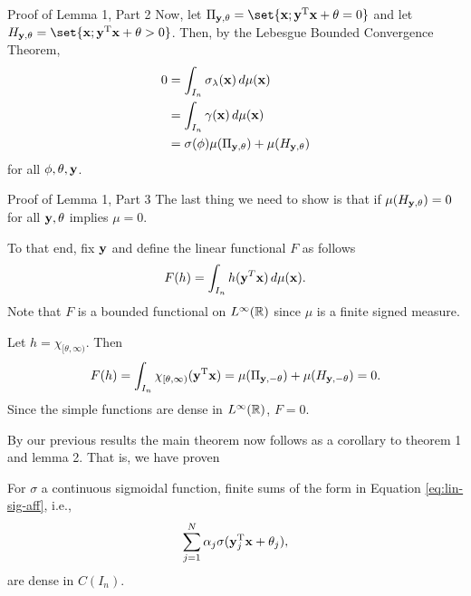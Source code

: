 \documentclass[11pt,letterpaper]{beamer}
\begin{document}
\begin{frame}{Proof of Lemma 1, Part 2}
  Now, let $\Pi_{\bfy,\theta}=\set{\bfx;\bfy^\rmT\bfx+\theta=0}$ and let
  $H_{\bfy,\theta}=\set{\bfx;\bfy^\rmT\bfx+\theta>0}$. Then, by the Lebesgue
  Bounded Convergence Theorem,
  \begin{align*}
    0&=\int_{I_n}\sigma_\lambda(\mathbf{x})\mathop{}\!d\mu(\mathbf{x})\\
     &=\int_{I_n}\gamma(\mathbf{x})\mathop{}\!d\mu(\mathbf{x})\\
     &=\sigma(\phi)\mu(\Pi_{\mathbf{y},\theta})+\mu(H_{\mathbf{y},\theta})
  \end{align*}
  for all $\phi,\theta,\mathbf{y}$.
\end{frame}

\begin{frame}{Proof of Lemma 1, Part 3}
  The last thing we need to show is that if $\mu(H_{\mathbf{y},\theta})=0$ for all
  $\mathbf{y},\theta$ implies $\mu=0$.

  To that end, fix $\mathbf{y}$ and define the linear functional $F$ as follows
  \[
    F(h)=\int_{I_n} h(\mathbf{y}^T\mathbf{x})\mathop{}\!d\mu(\mathbf{x}).
  \]
  Note that $F$ is a bounded functional on $L^\infty(\mathbb{R})$ since $\mu$ is a
  finite signed measure.

  Let $h=\chi_{[\theta,\infty)}$. Then
  \[
    F(h)=\int_{I_n}\chi_{[\theta,\infty)}(\mathbf{y}^{\mathrm{T}}\mathbf{x})=
    \mu(\Pi_{\mathbf{y},-\theta})+\mu(H_{\mathbf{y},-\theta})=0.
  \]
  Since the simple functions are dense in $L^\infty(\mathbb{R})$, $F=0$.
\end{frame}

\begin{frame}
  By our previous results the main theorem now follows as a corollary to theorem
  1 and lemma 2. That is, we have proven
  \begin{theorem}
    For $\sigma$ a continuous sigmoidal function, finite sums of the form in
    Equation \eqref{eq:lin-sig-aff}, i.e.,
    \[
      \sum_{j=1}^N \alpha_j\sigma(\mathbf{y}_j^{\mathrm{T}}\mathbf{x}+\theta_j),
    \]
  are dense in $C(I_n)$.
  \end{theorem}
\end{frame}
\end{document}
